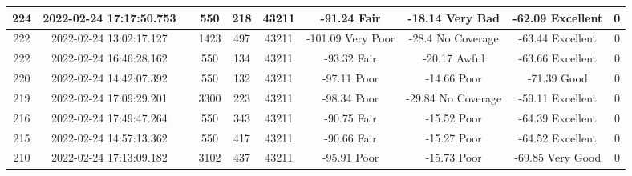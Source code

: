 \begin{longtable*}{|c|c|c|c|c|c|c|c|c|c|}
224&2022-02-24 17:17:50.753&&550&218&43211& -91.24    Fair        & -18.14    Very Bad    & -62.09    Excellent   & 0\\\hline
{}222&2022-02-24 13:02:17.127&&1423&497&43211& -101.09   Very Poor   & -28.4     No Coverage & -63.44    Excellent   & 0\\\hline
{}222&2022-02-24 16:46:28.162&&550&134&43211& -93.32    Fair        & -20.17    Awful       & -63.66    Excellent   & 0\\\hline
{}220&2022-02-24 14:42:07.392&&550&132&43211& -97.11    Poor        & -14.66    Poor        & -71.39    Good        & 0\\\hline
{}219&2022-02-24 17:09:29.201&&3300&223&43211& -98.34    Poor        & -29.84    No Coverage & -59.11    Excellent   & 0\\\hline
{}216&2022-02-24 17:49:47.264&&550&343&43211& -90.75    Fair        & -15.52    Poor        & -64.39    Excellent   & 0\\\hline
{}215&2022-02-24 14:57:13.362&&550&417&43211& -90.66    Fair        & -15.27    Poor        & -64.52    Excellent   & 0\\\hline
{}210&2022-02-24 17:13:09.182&&3102&437&43211& -95.91    Poor        & -15.73    Poor        & -69.85    Very Good   & 0\\\hline

\end{longtable*}
